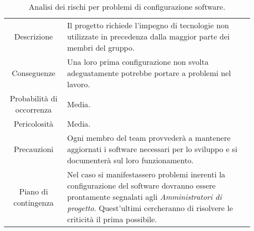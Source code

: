 \begin{table} [H]
    \begin{tabular}{|c|p{11.5cm}|}
    \rowcolor{darkblue} \hline
    \multicolumn{2}{|c|}{\textcolor{white}{\textbf{RT4 - Problemi nella configurazione software}}}\\ \hline
    Descrizione & Il progetto richiede l'impegno di tecnologie non utilizzate in precedenza dalla maggior parte dei membri del gruppo.\\ \hline
    Conseguenze & Una loro prima configurazione non svolta adeguatamente potrebbe portare a problemi nel lavoro.\\ \hline
    Probabilità di occorrenza & Media.\\ \hline
    Pericolosità & Media.\\ \hline
    Precauzioni & Ogni membro del team provvederà a mantenere aggiornati i software necessari per lo sviluppo e si documenterà sul loro funzionamento.\\ \hline
    Piano di contingenza & Nel caso si manifestassero problemi inerenti la configurazione del software dovranno essere prontamente segnalati agli \textit{Amministratori di progetto}. Quest'ultimi cercheranno di risolvere le criticità il prima possibile.\\ \hline
    \end{tabular}
    \caption{\label{tab:RT4}Analisi dei rischi per problemi di configurazione software.}
\end{table}
